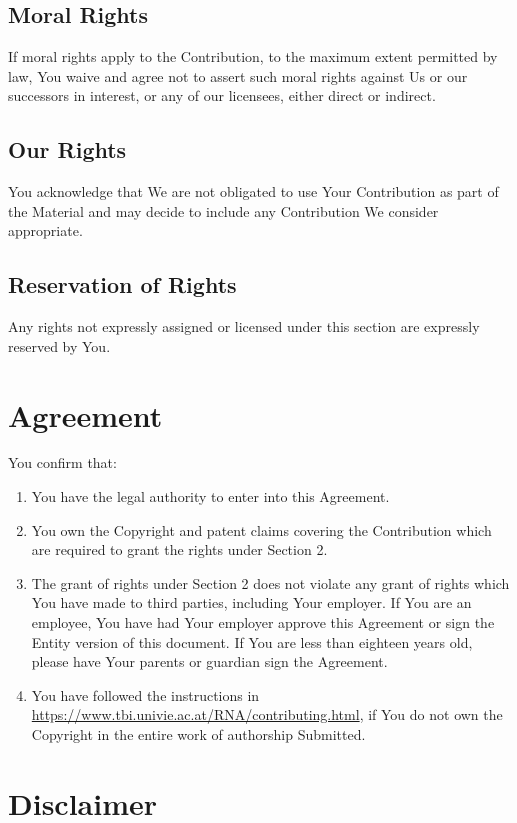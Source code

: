 \documentclass{article}
\begin{document}
\subsection{Moral Rights}
If moral rights apply to the Contribution, to the maximum extent permitted by
law, You waive and agree not to assert such moral rights against Us or our
successors in interest, or any of our licensees, either direct or indirect.

\subsection{Our Rights}
You acknowledge that We are not obligated to use Your Contribution as part of
the Material and may decide to include any Contribution We consider appropriate.

\subsection{Reservation of Rights}
Any rights not expressly assigned or licensed under this section are expressly
reserved by You.


\section{Agreement}

You confirm that:
\begin{enumerate}
\item You have the legal authority to enter into this Agreement.
\item You own the Copyright and patent claims covering the Contribution which
are required to grant the rights under Section 2.
\item The grant of rights under Section 2 does not violate any grant of rights
which You have made to third parties, including Your employer. If You are an
employee, You have had Your employer approve this Agreement or sign the Entity
version of this document. If You are less than eighteen years old, please have
Your parents or guardian sign the Agreement.
\item You have followed the instructions in
\url{https://www.tbi.univie.ac.at/RNA/contributing.html}, if You do not own the
Copyright in the entire work of authorship Submitted.
\end{enumerate}


\section{Disclaimer}
\end{document}
